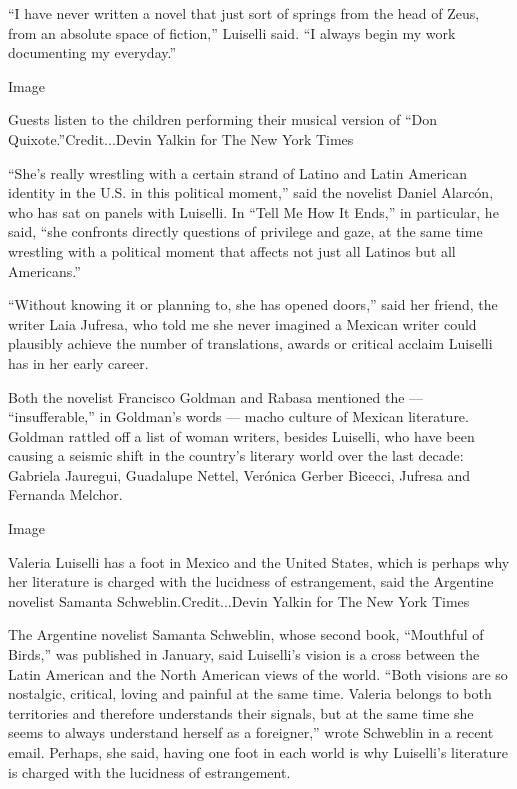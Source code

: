 ``I have never written a novel that just sort of springs from the head
of Zeus, from an absolute space of fiction,'' Luiselli said. ``I always
begin my work documenting my everyday.''

Image

Guests listen to the children performing their musical version of ``Don
Quixote.''Credit...Devin Yalkin for The New York Times

``She's really wrestling with a certain strand of Latino and Latin
American identity in the U.S. in this political moment,'' said the
novelist Daniel Alarcón, who has sat on panels with Luiselli. In ``Tell
Me How It Ends,'' in particular, he said, ``she confronts directly
questions of privilege and gaze, at the same time wrestling with a
political moment that affects not just all Latinos but all Americans.''

``Without knowing it or planning to, she has opened doors,'' said her
friend, the writer Laia Jufresa, who told me she never imagined a
Mexican writer could plausibly achieve the number of translations,
awards or critical acclaim Luiselli has in her early career.

Both the novelist Francisco Goldman and Rabasa mentioned the ---
``insufferable,'' in Goldman's words --- macho culture of Mexican
literature. Goldman rattled off a list of woman writers, besides
Luiselli, who have been causing a seismic shift in the country's
literary world over the last decade: Gabriela Jauregui, Guadalupe
Nettel, Verónica Gerber Bicecci, Jufresa and Fernanda Melchor.

Image

Valeria Luiselli has a foot in Mexico and the United States, which is
perhaps why her literature is charged with the lucidness of
estrangement, said the Argentine novelist Samanta
Schweblin.Credit...Devin Yalkin for The New York Times

The Argentine novelist Samanta Schweblin, whose second book, ``Mouthful
of Birds,'' was published in January, said Luiselli's vision is a cross
between the Latin American and the North American views of the world.
``Both visions are so nostalgic, critical, loving and painful at the
same time. Valeria belongs to both territories and therefore understands
their signals, but at the same time she seems to always understand
herself as a foreigner,'' wrote Schweblin in a recent email. Perhaps,
she said, having one foot in each world is why Luiselli's literature is
charged with the lucidness of estrangement.

